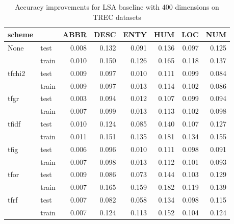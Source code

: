 \begin{table}[p]
\begin{center}

\begin{tabular}{llrrrrrr}
\toprule
scheme &  &  ABBR &  DESC &  ENTY &  HUM &  LOC &  NUM \\
\midrule
None & test &     0.008 &     0.132 &     0.091 &    0.136 &    0.097 &    0.125 \\
{} & train &     0.010 &     0.150 &     0.126 &    0.165 &    0.118 &    0.137 \\
tfchi2 & test &     0.009 &     0.097 &     0.010 &    0.111 &    0.099 &    0.084 \\
{} & train &     0.009 &     0.097 &     0.013 &    0.114 &    0.102 &    0.086 \\
tfgr & test &     0.003 &     0.094 &     0.012 &    0.107 &    0.099 &    0.094 \\
{} & train &     0.007 &     0.099 &     0.013 &    0.113 &    0.102 &    0.098 \\
tfidf & test &     0.010 &     0.124 &     0.085 &    0.140 &    0.107 &    0.127 \\
{} & train &     0.011 &     0.151 &     0.135 &    0.181 &    0.134 &    0.155 \\
tfig & test &     0.006 &     0.096 &     0.010 &    0.111 &    0.098 &    0.091 \\
{} & train &     0.007 &     0.098 &     0.013 &    0.112 &    0.101 &    0.093 \\
tfor & test &     0.009 &     0.086 &     0.073 &    0.144 &    0.103 &    0.129 \\
{} & train &     0.007 &     0.165 &     0.159 &    0.182 &    0.119 &    0.139 \\
tfrf & test &     0.007 &     0.082 &     0.058 &    0.134 &    0.098 &    0.115 \\
{} & train &     0.007 &     0.124 &     0.113 &    0.152 &    0.104 &    0.124 \\
\bottomrule
\end{tabular}

\caption[Accuracy improvements for LSA baseline with 400 dimensions on TREC datasets]{Accuracy improvements for LSA baseline with 400 dimensions on TREC datasets}
\label{tab:lsa:resuts:400:TREC}
\end{center}
\end{table}





